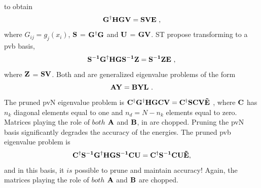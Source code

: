 %
to obtain 
\begin{equation}
\bf{G^{\dagger} H G V} = {\bf{S V E}} ~,
\label{PRLpvnunchop}
\end{equation}
where  $G_{ij}=g_j\left(x_i\right)$,  ${\bf{S}}$ = ${\bf{G^{\dagger} G}}$   and ${\bf{U}}$ = ${\bf{GV }}$.   
%
ST propose transforming to a pvb basis, 
\begin{equation}
\bf{S^{-1} G^{\dagger} H G S^{-1}  Z} = {\bf{ S^{-1}    Z E}} ~,
\label{bvnunchop}
\end{equation} 
where ${\bf{Z}}$ = ${\bf{S V }}$. 
Both  and  are generalized eigenvalue problems of the form 
\begin{equation}
\bf{AY } = {\bf{ BYL}}~.
\label{genform}
\end{equation}  
%
The pruned pvN eigenvalue problem is $\bf{     C^{\dagger}G^{\dagger} H  GCV}  =   \bf{C^{\dagger}SCV \tilde{E}}~$,
 where ${\bf{C}}$ has  $n_k$  diagonal elements equal to   one  and $n_d=N-n_k$  elements equal to zero.  Matrices  playing
 the role of $both$  ${\bf{A }}$  and $ {\bf{ B}}$,  in     are chopped.
Pruning  the pvN  basis significantly degrades the accuracy of the energies.   
%
The pruned pvb eigenvalue problem is 
%
\begin{equation}\label{PRLeq.3}
	{{\bf C^{\dagger}S^{-1}G^{\dagger} H  GS^{-1}CU}}={{\bf C^{\dagger}S^{-1}CU \tilde{E}}},
\end{equation}   
and in this basis, it $is$  possible to prune and maintain accuracy!
Again,    
the matrices playing  the role of $both$  ${\bf{A }}$  and $ {\bf{ B}}$  are chopped.   





